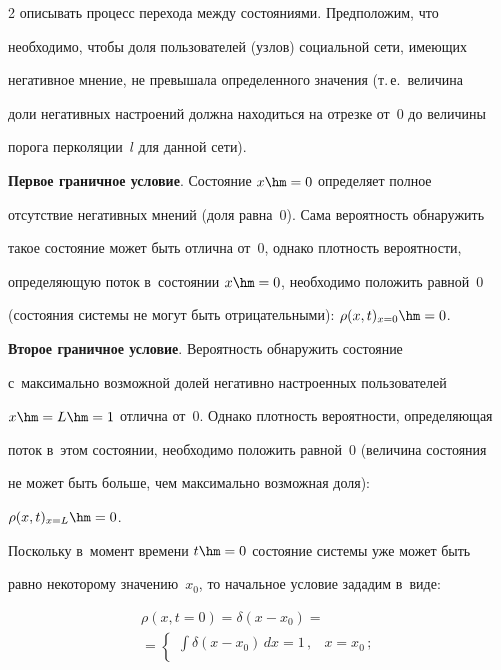 \begin{multicols}{2}
описывать процесс перехода между состояниями. Предположим, что 


необходимо, чтобы доля пользователей (узлов) социальной сети, имеющих 


негативное мнение, не превышала определенного значения (т.\,е.\ величина 


доли негативных настроений должна находиться на отрезке от~0 до величины 


порога перколяции~$l$ для данной сети).


  


  \textbf{Первое граничное условие}. Состояние $x\hm=0$ определяет полное 


отсутствие негативных мнений (доля равна~0). Сама вероятность обнаружить 


такое состояние может быть отлична от~0, однако плотность вероятности, 


определяющую поток в~состоянии $x\hm=0$, необходимо положить равной~0 


(состояния системы не могут быть отрицательными): $\rho(x,t)_{x=0}\hm=0$.


  


  \textbf{Второе граничное условие}. Вероятность обнаружить состояние 


с~максимально возможной долей негативно настроенных пользователей 


$x\hm=L\hm=1$ отлична от~0. Однако плотность вероятности, определяющая 


поток в~этом состоянии, необходимо положить равной~0 (величина состояния 


не может быть больше, чем максимально возможная доля): 


$\rho(x,t)_{x=L}\hm=0$.


  


  Поскольку в~момент времени $t\hm=0$ состояние системы уже может быть 


равно некоторому значению~$x_0$, то начальное условие зададим в~виде:


  \begin{multline*}


  \rho(x,t=0)=\delta(x-x_0)= {}\\


  {}=\begin{cases} 


  \displaystyle \int \delta(x-x_0)\,dx=1\,, &x=x_0\,;\\



\end{cases}
\end{multline*}
\end{multicols}
